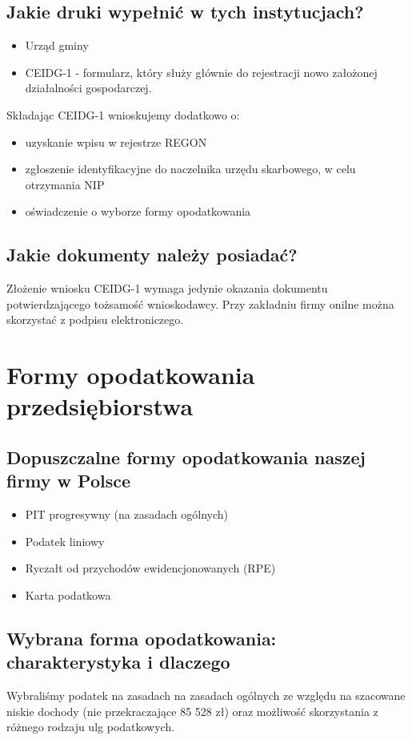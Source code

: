 \documentclass{sprawozdanie-agh}
\begin{document}
		\subsection{Jakie druki wypełnić w tych instytucjach?}

		\begin{itemize}
			\item Urząd gminy
			\item CEIDG-1 - formularz, który służy głównie do rejestracji nowo założonej działalności gospodarczej.
		\end{itemize}
		Składając CEIDG-1 wnioskujemy dodatkowo o:
		\begin{itemize}
			\item uzyskanie wpisu w rejestrze REGON
			\item zgłoszenie identyfikacyjne do naczelnika urzędu skarbowego, w celu otrzymania NIP 
			\item oświadczenie o wyborze formy opodatkowania
		\end{itemize}

		\subsection{Jakie dokumenty należy posiadać?}
		Złożenie wniosku CEIDG-1 wymaga jedynie okazania dokumentu potwierdzającego tożsamość wnioskodawcy. Przy zakładniu firmy onilne można skorzystać z podpisu elektroniczego.
	\section{Formy opodatkowania przedsiębiorstwa}

		\subsection{Dopuszczalne formy opodatkowania naszej firmy w Polsce}
		\begin{itemize}
			\item PIT progresywny (na zasadach ogólnych)
			\item Podatek liniowy 
			\item Ryczałt od przychodów ewidencjonowanych (RPE)
			\item Karta podatkowa
		\end{itemize}
		\subsection{Wybrana forma opodatkowania: charakterystyka i dlaczego}
		Wybraliśmy podatek na zasadach na zasadach ogólnych ze względu na szacowane niskie dochody (nie przekraczające 85 528 zł) oraz możliwość skorzystania z różnego rodzaju ulg podatkowych.
\end{document}
